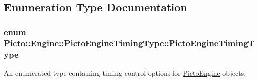 \subsection{Enumeration Type Documentation}
\hypertarget{namespace_picto_1_1_engine_1_1_picto_engine_timing_type_a3b9833c69033de872a089c4c79a7496c}{
\subsubsection[{Picto\-Engine\-Timing\-Type}]{\setlength{\rightskip}{0pt plus 5cm}enum {\bf Picto\-::\-Engine\-::\-Picto\-Engine\-Timing\-Type\-::\-Picto\-Engine\-Timing\-Type}}}\label{namespace_picto_1_1_engine_1_1_picto_engine_timing_type_a3b9833c69033de872a089c4c79a7496c}


An enumerated type containing timing control options for \hyperlink{class_picto_1_1_engine_1_1_picto_engine}{Picto\-Engine} objects. 

